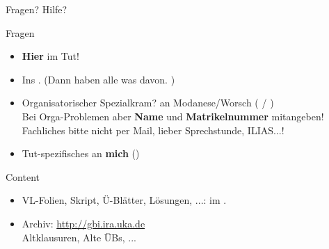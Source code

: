 \begin{frame}{Fragen? Hilfe?}	
	\begin{block}{Fragen}
		\begin{itemize}
			\item \textbf{Hier} im Tut!
			\item Ins \ILIAS. (Dann haben alle was davon. \smiley) \\
			\pause
			\item Organisatorischer Spezialkram? \impl an Modanese/Worsch ( / ) \\
			Bei Orga-Problemen aber \textbf{Name} und \textbf{Matrikelnummer}  mitangeben! \\
			Fachliches bitte nicht per Mail, lieber \impl Sprechstunde, ILIAS...!
			\item Tut-spezifisches an \textbf{mich} (\mailto{\mymail})
		\end{itemize}
	\end{block}
	\pause
	\begin{block}{Content}
		\begin{itemize}
			\item VL-Folien, Skript, Ü-Blätter, Lösungen, ...: im \ILIAS.
			\item Archiv: \url{http://gbi.ira.uka.de} \\
			Altklausuren, Alte ÜBs, ...
		\end{itemize}
	\end{block}
\end{frame}


